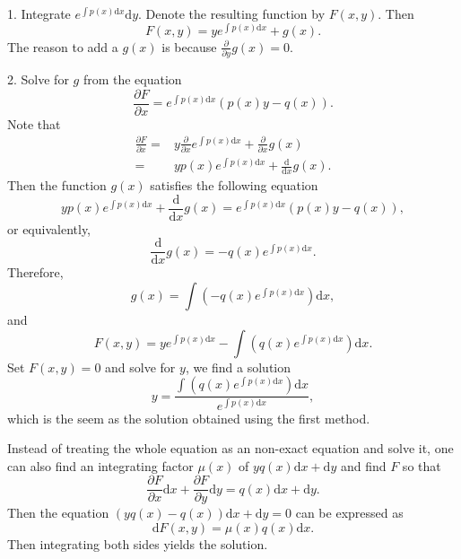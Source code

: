 \begin{subappendices}
1. Integrate $e^{\int p(x)\mathrm{d}x} \mathrm{d} y$. Denote the resulting function by $F(x, y)$. Then
    $$F(x, y)=ye^{\int p(x)\mathrm{d}x} + g(x).$$ The reason to add a $g(x)$ is because $\frac{\partial}{\partial y}g(x)=0$.

2. Solve for $g$ from the equation
    $$\frac{\partial F}{\partial x}=e^{\int p(x)\mathrm{d}x}(p(x)y-q(x)).$$
    Note that
    $$
    \begin{aligned}
    \frac{\partial F}{\partial x}=&y\frac{\partial}{\partial x}e^{\int p(x)\mathrm{d} x}+\frac{\partial}{\partial x}g(x)\\
    =&yp(x)e^{\int p(x)\mathrm{d} x}+\frac{\mathrm{d}}{\mathrm{d} x}g(x).
    \end{aligned}
    $$
  Then the function $g(x)$ satisfies the following equation
  $$yp(x)e^{\int p(x)\mathrm{d} x}+\frac{\mathrm{d}}{\mathrm{d} x}g(x)=e^{\int p(x)\mathrm{d}x}(p(x)y-q(x)),$$
  or equivalently,
  $$\frac{\mathrm{d}}{\mathrm{d} x}g(x)=-q(x)e^{\int p(x)\mathrm{d}x}.$$
  Therefore,
  $$g(x)=\int\left(-q(x)e^{\int p(x)\mathrm{d}x}\right)\mathrm{d}x,$$
  and
  $$F(x, y)=ye^{\int p(x)\mathrm{d}x}-\int\left(q(x)e^{\int p(x)\mathrm{d}x}\right)\mathrm{d}x.$$
  Set $F(x, y)=0$ and solve for $y$, we find a solution
  $$y=\dfrac{\int\left(q(x)e^{\int p(x)\mathrm{d}x}\right)\mathrm{d}x}{e^{\int p(x)\mathrm{d}x}},$$
  which is the seem as the solution obtained using the first method.

\begin{remark}
Instead of treating the whole equation as an non-exact equation and solve it, one can also find an integrating factor $\mu(x)$ of $yq(x)\mathrm{d} x + \mathrm{d} y$ and find $F$ so that
$$\frac{\partial F}{\partial x}\mathrm{d} x + \frac{\partial F}{\partial y}\mathrm{d} y=q(x)\mathrm{d} x + \mathrm{d} y.$$
Then the equation $(yq(x)-q(x))\mathrm{d} x + \mathrm{d} y=0$ can be expressed as
$$\mathrm{d} F(x, y)=\mu(x)q(x)\mathrm{d} x.$$
Then integrating both sides yields the solution.
\end{remark}

\end{subappendices}